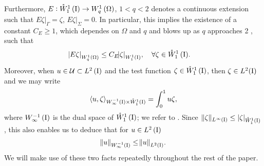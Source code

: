 \documentclass[final]{siamltex}
\begin{document}
Furthermore, $E:{{\mathring{W}^{{1}}_{{1}}\del{{\text{\rm I}}}}} \rightarrow {{W^{{1}}_{{q}}\del{{\Omega}}}}$, $1<q<2$ 
denotes a continuous extension such that $E\zeta{\vert}_{\Gamma}=\zeta$, $E\zeta{\vert}_{\Sigma} = 0$. In particular, this implies the existence of
a constant $C_E \ge 1$, which dependes on $\Omega$ and $q$ and blows up as $q$ approaches 2 
\cite[Lemma 2]{PSaavedra_RScott_1991}, such that
	\begin{align}  \label{eq:w1_wq_ext}
    	{\abs{{E\zeta}}_{{W^{{{1}}}_{{{q}}}\del{{{\Omega}}}}}} &\leq C_E {\abs{{\zeta}}_{{W^{{{1}}}_{{{1}}}\del{{\text{\rm I}}}}}},  \quad
    		\forall \zeta \in {{\mathring{W}^{{1}}_{{1}}\del{{\text{\rm I}}}}}.
	\end{align}
Moreover, when $u \in {\mathcal{U}} \subset {{L^2\del{{\text{\rm I}}}}}$ and the test function 
$\zeta \in {{\mathring{W}^{{1}}_{{1}}\del{{\text{\rm I}}}}}$, then  $\zeta \in L^2({\text{\rm I}})$ and we may write 
	\begin{align} \label{eq:u_zeta_pair} 
        {{\mathop{{\left\langle {{u,\zeta}} \right\rangle}}}_{{{W^{{-{1}}}_{{{\infty}}}\del{{{\text{\rm I}}}}}}\times{{\mathring{W}^{{{1}}}_{{{1}}}\del{{{\text{\rm I}}}}}}}} = \int_0^1 u \zeta ,
	\end{align}
where ${{W^{{-1}}_{{\infty}}\del{\text{\rm I}}}}$ is the dual space of ${{\mathring{W}^{{1}}_{{1}}\del{{\text{\rm I}}}}}$; we refer to \cite{RAAdams_JJFFournier_2003}. 
Since $\|\zeta\|_{L^\infty({\text{\rm I}})} \le |\zeta|_{{{\mathring{W}^{1}_{1}\del{{\text{\rm I}}}}}}$,
this also enables us to deduce that for $u \in {{L^2\del{{\text{\rm I}}}}}$
	\begin{align}\label{eq:u_negative_to_l2}
		{\norm{{u}}_{{W^{{{-1}}}_{{\infty}}\del{{{\text{\rm I}}}}}}} 
		\leq {\norm{{u}}_{{L^2\del{{{\text{\rm I}}}}}}}.
	\end{align}
We will make use of these two facts repeatedly throughout the rest of the 
paper.
\end{document}
